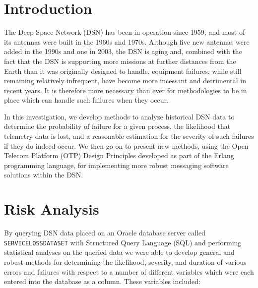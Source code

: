 \documentclass[aps,twocolumn,nobalancelastpage,amsmath,amssymb,
nofootinbib,superscriptaddress, ]{revtex4}
\begin{document}
\section{Introduction}

The Deep Space Network (DSN) has been in operation since 1959, and most of its antennas were built in the 1960s and 1970s. Although five new antennas were added in the 1990s and one in 2003, the DSN is aging and, combined with the fact that the DSN is supporting more missions at further distances from the Earth than it was originally designed to handle, equipment failures, while still remaining relatively infrequent, have become more incessant and detrimental in recent years. \cite{bagri2007} \cite{wackley2011} It is therefore more necessary than ever for methodologies to be in place which can handle such failures when they occur.

In this investigation, we develop methods to analyze historical DSN data to determine the probability of failure for a given process, the likelihood that telemetry data is lost, and a reasonable estimation for the severity of such failures if they do indeed occur. We then go on to present new methods, using the Open Telecom Platform (OTP) Design Principles developed as part of the Erlang programming language, for implementing more robust messaging software solutions within the DSN.

\section{Risk Analysis}


By querying DSN data placed on an Oracle database server called \texttt{SERVICELOSSDATASET} with Structured Query Language (SQL) and performing statistical analyses on the queried data we were able to develop general and robust methods for determining the likelihood, severity, and duration of various errors and failures with respect to a number of different variables which were each entered into the database as a column. These variables included:
\end{document}
